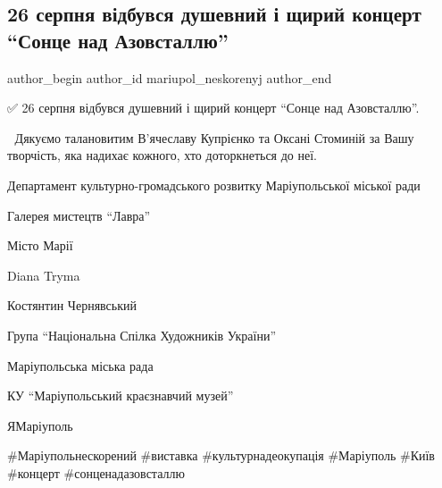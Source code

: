  
 
 
 
 
 
\subsection{26 серпня відбувся душевний і щирий концерт \enquote{Сонце над Азовсталлю}}
\label{sec:27_08_2023.fb.mariupol_neskorenyj.1.koncert_sonce_nad_azovstallu}
 
\ifcmt
 author_begin
   author_id mariupol_neskorenyj
 author_end
\fi

✅️ 26 серпня відбувся душевний і щирий концерт \enquote{Сонце над Азовсталлю}.\par
🤗 Дякуємо талановитим В'ячеславу Купрієнко та Оксані Стоминій за Вашу творчість, яка надихає кожного, хто доторкнеться до неї. 💖\par
Департамент культурно-громадського розвитку Маріупольської міської ради \par
Галерея мистецтв \enquote{Лавра} \par
Місто Марії \par
Diana Tryma \par
Костянтин Чернявський \par
Група \enquote{Національна Спілка Художників України} \par
Маріупольська міська рада \par
КУ \enquote{Маріупольський краєзнавчий музей} \par
ЯМаріуполь \par
\#Маріупольнескорений \#виставка \#культурнадеокупація \#Маріуполь \#Київ \#концерт \#сонценадазовсталлю\par
